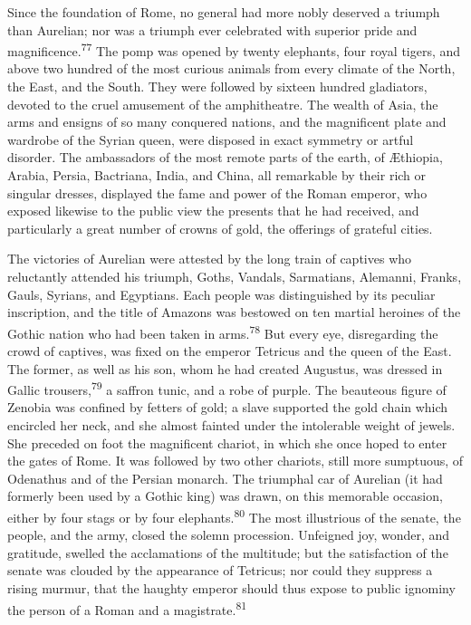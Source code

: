 
Since the foundation of Rome, no general had more nobly deserved
a triumph than Aurelian; nor was a triumph ever celebrated with
superior pride and magnificence.\textsuperscript{77} The pomp was opened by twenty
elephants, four royal tigers, and above two hundred of the most
curious animals from every climate of the North, the East, and
the South. They were followed by sixteen hundred gladiators,
devoted to the cruel amusement of the amphitheatre. The wealth of
Asia, the arms and ensigns of so many conquered nations, and the
magnificent plate and wardrobe of the Syrian queen, were disposed
in exact symmetry or artful disorder. The ambassadors of the most
remote parts of the earth, of Æthiopia, Arabia, Persia,
Bactriana, India, and China, all remarkable by their rich or
singular dresses, displayed the fame and power of the Roman
emperor, who exposed likewise to the public view the presents
that he had received, and particularly a great number of crowns
of gold, the offerings of grateful cities.

The victories of Aurelian were attested by the long train of
captives who reluctantly attended his triumph, Goths, Vandals,
Sarmatians, Alemanni, Franks, Gauls, Syrians, and Egyptians. Each
people was distinguished by its peculiar inscription, and the
title of Amazons was bestowed on ten martial heroines of the
Gothic nation who had been taken in arms.\textsuperscript{78} But every eye,
disregarding the crowd of captives, was fixed on the emperor
Tetricus and the queen of the East. The former, as well as his
son, whom he had created Augustus, was dressed in Gallic
trousers,\textsuperscript{79} a saffron tunic, and a robe of purple. The beauteous
figure of Zenobia was confined by fetters of gold; a slave
supported the gold chain which encircled her neck, and she almost
fainted under the intolerable weight of jewels. She preceded on
foot the magnificent chariot, in which she once hoped to enter
the gates of Rome. It was followed by two other chariots, still
more sumptuous, of Odenathus and of the Persian monarch. The
triumphal car of Aurelian (it had formerly been used by a Gothic
king) was drawn, on this memorable occasion, either by four stags
or by four elephants.\textsuperscript{80} The most illustrious of the senate, the
people, and the army, closed the solemn procession. Unfeigned
joy, wonder, and gratitude, swelled the acclamations of the
multitude; but the satisfaction of the senate was clouded by the
appearance of Tetricus; nor could they suppress a rising murmur,
that the haughty emperor should thus expose to public ignominy
the person of a Roman and a magistrate.\textsuperscript{81}

